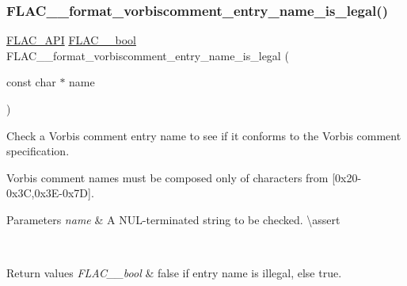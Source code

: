 \subsubsection{\texorpdfstring{FLAC\_\_format\_vorbiscomment\_entry\_name\_is\_legal()}{FLAC\_\_format\_vorbiscomment\_entry\_name\_is\_legal()}}
{\footnotesize\ttfamily \mbox{\hyperlink{group__flac__export_ga56ca07df8a23310707732b1c0007d6f5}{F\+L\+A\+C\+\_\+\+A\+PI}} \mbox{\hyperlink{ordinals_8h_a95103469f1cbd78b8cf250194985b34e}{F\+L\+A\+C\+\_\+\+\_\+bool}} F\+L\+A\+C\+\_\+\+\_\+format\+\_\+vorbiscomment\+\_\+entry\+\_\+name\+\_\+is\+\_\+legal (\begin{DoxyParamCaption}\item[{const char $\ast$}]{name }\end{DoxyParamCaption})}

Check a Vorbis comment entry name to see if it conforms to the Vorbis comment specification.

Vorbis comment names must be composed only of characters from \mbox{[}0x20-\/0x3C,0x3\+E-\/0x7D\mbox{]}.


\begin{DoxyParams}{Parameters}
{\em name} & A N\+U\+L-\/terminated string to be checked. \textbackslash{}assert 
\begin{DoxyCode}{1}
\end{DoxyCode}
 \\
\hline
\end{DoxyParams}

\begin{DoxyRetVals}{Return values}
{\em F\+L\+A\+C\+\_\+\+\_\+bool} & {\ttfamily false} if entry name is illegal, else {\ttfamily true}. \\
\hline
\end{DoxyRetVals}
\mbox{\label{group__flac__format_gae0707c9d46b2af02f1e145bdae331605}} 
